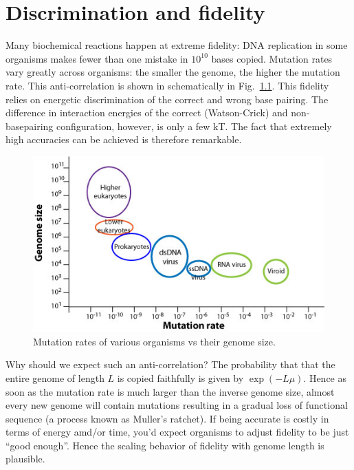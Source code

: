 \chapter{Discrimination and fidelity}

Many biochemical reactions happen at extreme fidelity: DNA replication in some organisms makes fewer than one mistake in $10^{10}$ bases copied.
Mutation rates vary greatly across organisms: the smaller the genome, the higher the mutation rate.
This anti-correlation is shown in schematically in Fig.~\ref{fig:mutation_rates}.
This fidelity relies on energetic discrimination of the correct and wrong base pairing.
The difference in interaction energies of the correct (Watson-Crick) and non-basepairing configuration, however, is only a few kT.
The fact that extremely high accuracies can be achieved is therefore remarkable.

\begin{figure}[tb]
	\centering
	\includegraphics[width=\textwidth]{figures/mutation_rates.jpg}
	\caption{Mutation rates of various organisms vs their genome size.}
	\label{fig:mutation_rates}
\end{figure}

Why should we expect such an anti-correlation?
The probability that that the entire genome of length $L$ is copied faithfully is given by $\exp(-L\mu)$.
Hence as soon as the mutation rate is much larger than the inverse genome size, almost every new genome will contain mutations resulting in a gradual loss of functional sequence (a process known as Muller's ratchet).
If being accurate is costly in terms of energy amd/or time, you'd expect organisms to adjust fidelity to be just ``good enough''. Hence the scaling behavior of fidelity with genome length is plausible.

